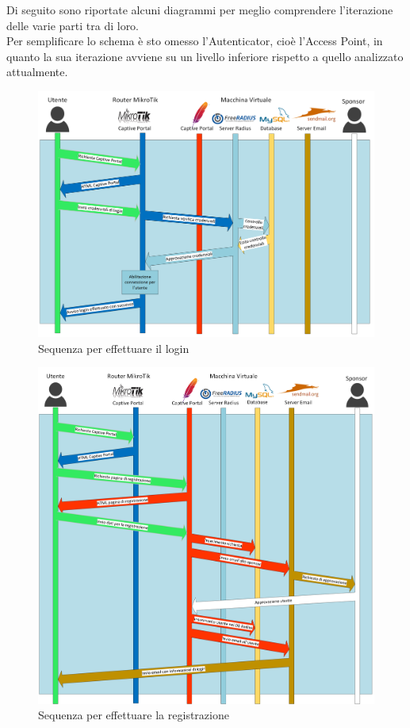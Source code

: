 \documentclass[Realizzazione.tex]{subfiles}
\begin{document}
Di seguito sono riportate alcuni diagrammi per meglio comprendere l'iterazione delle varie parti tra di loro. \\
Per semplificare lo schema è sto omesso l'Autenticator, cioè l'Access Point, in quanto la sua iterazione avviene su un livello inferiore rispetto a quello analizzato attualmente.

\begin{figure}[H]
	\centering
	\hspace*{-2.6cm}
	\includegraphics[width=19.8cm]{"images/CaptivePortal1"}
	\caption{Sequenza per effettuare il login}
	\label{fig:Sequenza per effettuare il login}
\end{figure}
\begin{figure}[H]
	\centering
	\hspace*{-2.6cm}
	\includegraphics[width=19.8cm]{"images/CaptivePortal2"}
	\caption{Sequenza per effettuare la registrazione}
	\label{fig:Sequenza per effettuare la registrazione}
\end{figure}
\end{document}
